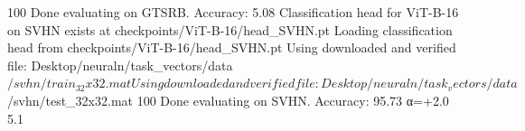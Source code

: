 100%
Done evaluating on GTSRB. Accuracy: 5.08%
Classification head for ViT-B-16 on SVHN exists at checkpoints/ViT-B-16/head_SVHN.pt
Loading classification head from checkpoints/ViT-B-16/head_SVHN.pt
Using downloaded and verified file: Desktop/neuraln/task_vectors/data$/svhn/train_32x32.mat
Using downloaded and verified file: Desktop/neuraln/task_vectors/data$/svhn/test_32x32.mat
100%
Done evaluating on SVHN. Accuracy: 95.73%
  α=+2.0         5.1%

